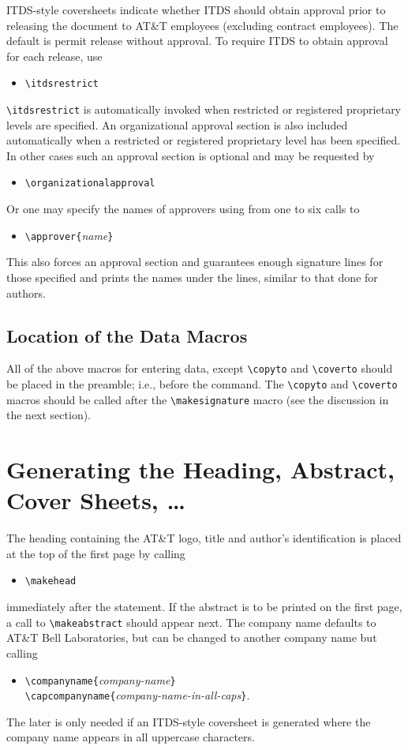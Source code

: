 ITDS-style coversheets indicate whether ITDS should obtain approval prior
to releasing the document to AT\&T employees 
(excluding contract employees).  The default is permit release
without approval.  To require ITDS to obtain approval for each
release, use
\begin{itemize}
\item[]
\verb|\itdsrestrict|
\end{itemize}
\verb|\itdsrestrict| is automatically invoked when restricted or registered
proprietary levels are specified.
An organizational approval section is also included automatically 
when a restricted or registered proprietary level has been
specified.  In other cases such an approval section is optional and
may be requested by 
\begin{itemize}
\item[]
\verb|\organizationalapproval|
\end{itemize}
Or one may specify the names of approvers using from one to six calls to
\begin{itemize}
\item[]
\verb|\approver{|{\it name}\verb|}|
\end{itemize}
This also forces an approval section and guarantees enough signature
lines for those specified and prints the names under the lines,
similar to that done for authors.

\subsection{Location of the Data Macros}
All of the above macros for entering data, except \verb|\copyto| and
\verb|\coverto|  should be placed in the
preamble; i.e., before the \verb|| command.  The
\verb|\copyto| and \verb|\coverto| macros should be called after the
\verb|\makesignature| macro (see the discussion in the next section).
\section{Generating the Heading, Abstract, Cover Sheets, \dots}
The heading containing the AT\&T logo, title and author's
identification is placed at the top of the first page by calling
\begin{itemize}
\item[]
\verb|\makehead|
\end{itemize}
immediately after the \verb|| statement.  If the
abstract is to be printed on the first page, a call to
\verb|\makeabstract| should appear next.  The company name defaults to
AT\&T Bell Laboratories, but can be changed to another company name
but calling
\begin{itemize}
\item[]
\verb|\companyname{|{\it company-name}\verb|}|\\
\verb|\capcompanyname{|{\it company-name-in-all-caps}\verb|}|.
\end{itemize}
The later is only needed if an ITDS-style coversheet is generated where the
company name appears in all uppercase characters.

